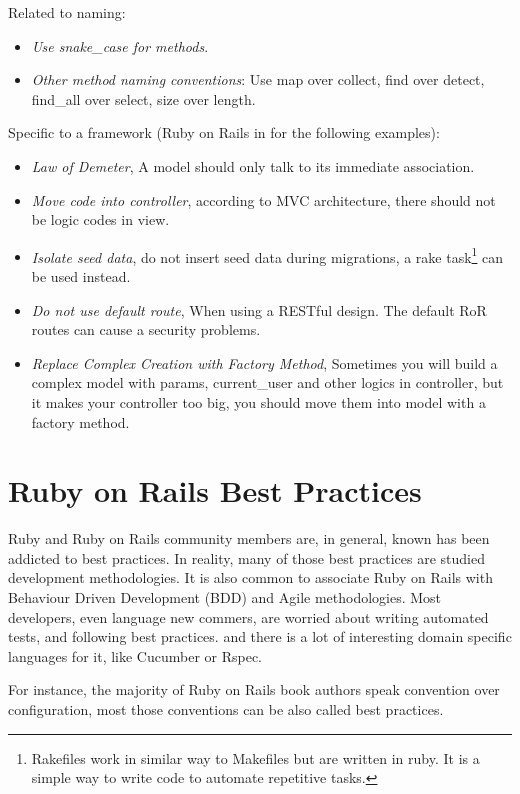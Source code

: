 Related to naming:
\begin{itemize}
\item \emph{Use snake\_case for methods}.
\item \emph{Other method naming conventions}: Use map over collect, find over detect, find\_all over select, size over length.
\end{itemize}

Specific to a framework (Ruby on Rails in for the following examples):
\begin{itemize}
\item \emph{Law of Demeter}, A model should only talk to its immediate association.
\item \emph{Move code into controller}, according to MVC architecture, there should not be logic codes in view.
\item \emph{Isolate seed data}, do not insert seed data during migrations, a 
rake task\footnote{ 
  Rakefiles work in similar way to Makefiles but are written in ruby. It is a simple way to write code to automate repetitive tasks. 
} can be used instead.
\item \emph{Do not use default route}, When using a RESTful design. The default RoR routes can cause a security problems.
\item \emph{Replace Complex Creation with Factory Method}, Sometimes you will build a complex model with params, current\_user and other logics in controller, but it makes your controller too big, you should move them into model with a factory method.
\end{itemize}



\section{Ruby on Rails Best Practices} \label{sec:ror_best_practives}

Ruby and Ruby on Rails community members are, in general, known has been addicted to best practices.
In reality, many of those best practices are studied development methodologies.
It is also common to associate Ruby on Rails with Behaviour Driven Development (BDD) and Agile methodologies.
Most developers, even language new commers, are worried about writing automated tests, and following best practices.
and there is a lot of interesting domain specific languages for it, like Cucumber or Rspec.


For instance, the majority of Ruby on Rails book authors speak convention over configuration,
most those conventions can be also called best practices.


